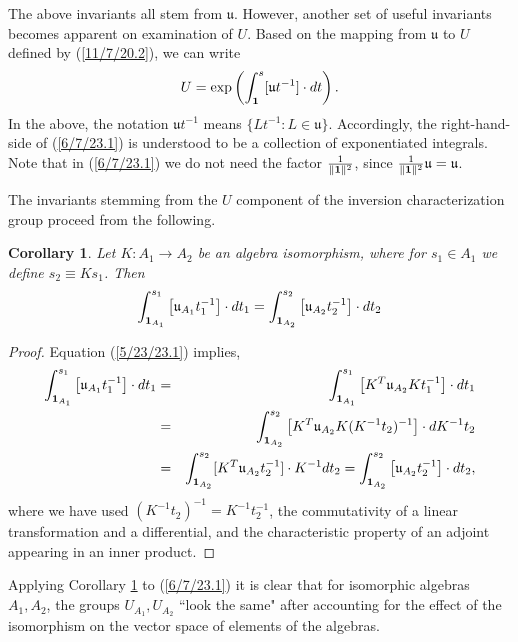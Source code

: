 \documentclass{amsart}
\numberwithin{equation}{section}
\newtheorem{corollary}[theorem]{Corollary}
\theoremstyle{definition}
\numberwithin{theorem}{section}
\begin{document}
The above invariants all stem from $\mathfrak{u}$.  However, another set of useful invariants becomes apparent on examination of $ U$.  Based on the mapping from $\mathfrak{u}$ to $ U$ defined by (\ref{11/7/20.2}),  we can write \begin{equation}  U = \exp\left(\int_{\bf 1}^s [\mathfrak{u}t^{-1}]\cdot dt\right). \label{6/7/23.1}\end{equation}  In the above, the notation $\mathfrak{u}t^{-1}$ means $\{Lt^{-1}: L\in \mathfrak{u}\}$.  Accordingly, the right-hand-side of (\ref{6/7/23.1}) is understood to be a collection of exponentiated integrals.   Note that in (\ref{6/7/23.1}) we do not need the factor $\frac{1}{\|{\bf 1}\|^2}$, since $\frac{1}{\|{\bf 1}\|^2}\mathfrak{u}=\mathfrak{u}$.  

The invariants stemming from the $U$ component of the inversion characterization group proceed from the following. 


\begin{corollary}\label{6/6/23.2} Let $K:A_1\rightarrow A_2$ be an algebra isomorphism, where for $s_1\in A_1$ we define $s_2\equiv Ks_1$.  Then \[ \int_{{\bf 1}_{A_1}}^{s_1} \left[\mathfrak{u}_{A_1}t_1^{-1}\right]\cdot dt_1 
= \int_{{\bf 1}_{A_2}}^{s_2} \left[\mathfrak{u}_{A_2}t_2^{-1}\right]\cdot dt_2  \] \end{corollary}

\begin{proof} 
Equation (\ref{5/23/23.1}) implies,
\begin{eqnarray*} \int_{{\bf 1}_{A_1}}^{s_1} \left[\mathfrak{u}_{A_1}t_1^{-1}\right]\cdot dt_1 &=& \int_{{\bf 1}_{A_1}}^{s_1} \left[ K^T\mathfrak{u}_{A_2}Kt_1^{-1}\right]\cdot dt_1 \\ &=& 
\int_{{\bf 1}_{A_2}}^{s_2} \left[ K^T\mathfrak{u}_{A_2}K (K^{-1}t_2)^{-1}\right]\cdot dK^{-1}t_2 \\ &=& \int_{{\bf 1}_{A_2}}^{s_2} [K^T\mathfrak{u}_{A_2}t_2^{-1}]\cdot K^{-1}dt_2 = \int_{{\bf 1}_{A_2}}^{s_2} \left[\mathfrak{u}_{A_2}t_2^{-1}\right]\cdot dt_2, 
\end{eqnarray*}
where we have used $(K^{-1}t_2)^{-1} = K^{-1}t_2^{-1}$, the commutativity of a linear transformation and a differential, and the characteristic property of an adjoint appearing in an inner product.
\end{proof}

Applying Corollary \ref{6/6/23.2} to (\ref{6/7/23.1}) it is clear that for isomorphic algebras $A_1,A_2$, the groups $ U_{A_1},  U_{A_2}$ ``look the same" after accounting for the effect of the isomorphism on the vector space of elements of the algebras.
\end{document}
